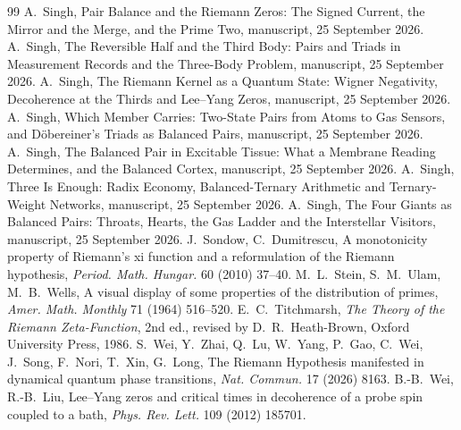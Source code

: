 \documentclass[11pt]{article}
\theoremstyle{definition}\newtheorem{definition}[theorem]{Definition}
\theoremstyle{remark}\newtheorem{remark}[theorem]{Remark}
\begin{document}
\begin{thebibliography}{99}
 A.~Singh, Pair Balance and the Riemann Zeros: The Signed Current, the Mirror and the Merge, and the Prime Two, manuscript, 25 September 2026.
 A.~Singh, The Reversible Half and the Third Body: Pairs and Triads in Measurement Records and the Three-Body Problem, manuscript, 25 September 2026.
 A.~Singh, The Riemann Kernel as a Quantum State: Wigner Negativity, Decoherence at the Thirds and Lee--Yang Zeros, manuscript, 25 September 2026.
 A.~Singh, Which Member Carries: Two-State Pairs from Atoms to Gas Sensors, and D\"obereiner's Triads as Balanced Pairs, manuscript, 25 September 2026.
 A.~Singh, The Balanced Pair in Excitable Tissue: What a Membrane Reading Determines, and the Balanced Cortex, manuscript, 25 September 2026.
 A.~Singh, Three Is Enough: Radix Economy, Balanced-Ternary Arithmetic and Ternary-Weight Networks, manuscript, 25 September 2026.
 A.~Singh, The Four Giants as Balanced Pairs: Throats, Hearts, the Gas Ladder and the Interstellar Visitors, manuscript, 25 September 2026.
 J.~Sondow, C.~Dumitrescu, A monotonicity property of Riemann's xi function and a reformulation of the Riemann hypothesis, \emph{Period. Math. Hungar.} 60 (2010) 37--40.
 M.~L.~Stein, S.~M.~Ulam, M.~B.~Wells, A visual display of some properties of the distribution of primes, \emph{Amer. Math. Monthly} 71 (1964) 516--520.
 E.~C.~Titchmarsh, \emph{The Theory of the Riemann Zeta-Function}, 2nd ed., revised by D.~R.~Heath-Brown, Oxford University Press, 1986.
 S.~Wei, Y.~Zhai, Q.~Lu, W.~Yang, P.~Gao, C.~Wei, J.~Song, F.~Nori, T.~Xin, G.~Long, The Riemann Hypothesis manifested in dynamical quantum phase transitions, \emph{Nat. Commun.} 17 (2026) 8163.
 B.-B.~Wei, R.-B.~Liu, Lee--Yang zeros and critical times in decoherence of a probe spin coupled to a bath, \emph{Phys. Rev. Lett.} 109 (2012) 185701.
\end{thebibliography}
\end{document}
